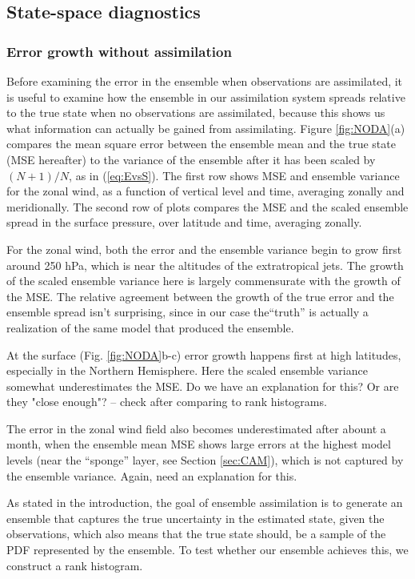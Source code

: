 \subsection{State-space diagnostics}
\label{sec:erpda}
\subsubsection{Error growth without assimilation}

Before examining the error in the ensemble when observations are assimilated, it is useful to examine how the ensemble in our assimilation system spreads relative to the true state when no observations are assimilated, because this shows us what information can actually be gained from assimilating.
Figure \ref{fig:NODA}(a) compares the  mean square error  between the ensemble mean and the true state (MSE hereafter) to the  variance of the ensemble after it has been scaled by $(N+1)/N$, as in (\ref{eq:EvsS}).
The first row shows MSE and ensemble variance for the zonal wind, as a function of vertical level and time, averaging zonally and meridionally.  
The second row of plots compares the MSE and the scaled ensemble spread in the surface pressure, over latitude and time, averaging zonally.  

For the zonal wind, both the error and the ensemble variance begin to grow first around 250 hPa, which is near the altitudes of the extratropical jets.
The growth of the scaled ensemble variance here is largely commensurate with the growth of the MSE.
\textcolor{unsure}{The relative agreement between the growth of the true error and the ensemble spread isn't surprising, since in our case the``truth'' is actually a realization of the same model that produced the ensemble.}

At the surface (Fig. \ref{fig:NODA}b-c) error growth happens first at high latitudes, especially in the Northern Hemisphere.
Here the scaled ensemble variance somewhat underestimates the MSE.
\textcolor{alert}{Do we have an explanation for this?  Or are they "close enough"? -- check after comparing to rank histograms.}

The error in the zonal wind field also becomes underestimated after abount a month, when the ensemble mean MSE shows large errors at the highest model levels (near the ``sponge'' layer, see Section \ref{sec:CAM}), which is not captured by the ensemble variance.
\textcolor{alert}{Again, need an explanation for this.}

As stated in the introduction, the goal of ensemble assimilation is to generate an ensemble that captures the true uncertainty in the estimated state, given the observations, which also means that the true state should, be a sample of the PDF represented by the ensemble.
To test whether our ensemble achieves this, we construct a rank histogram.

